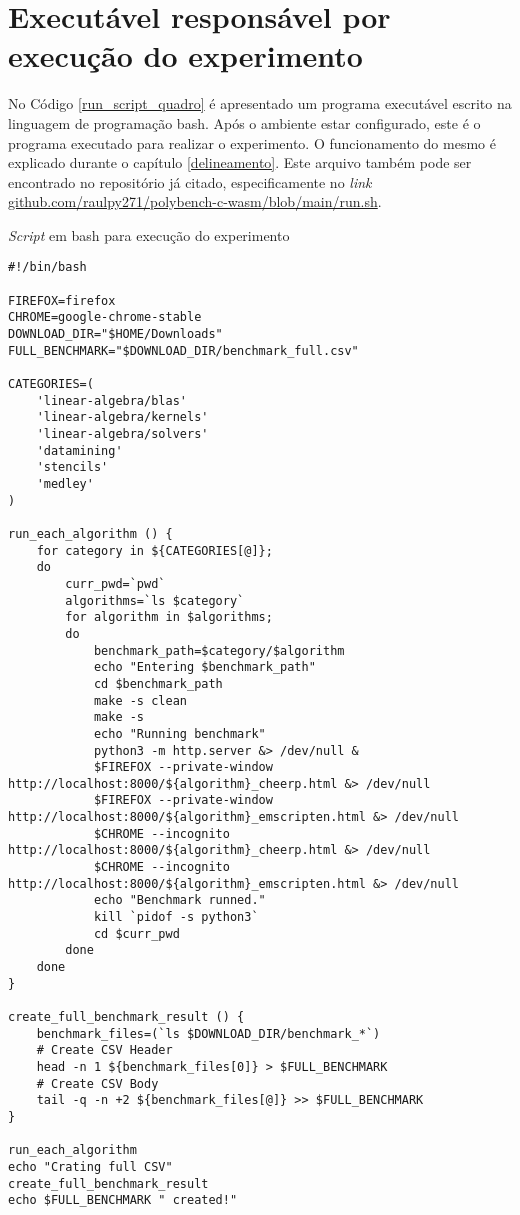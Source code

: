 
\chapter{Executável responsável por execução do experimento}\label{run_script}

No Código \ref{run_script_quadro} é apresentado um programa executável escrito na linguagem de programação bash. Após o ambiente estar configurado, este é o programa executado para realizar o experimento. O funcionamento do mesmo é explicado durante o capítulo \ref{delineamento}. Este arquivo também pode ser encontrado no repositório já citado, especificamente no \textit{link} \href{https://github.com/raulpy271/polybench-c-wasm/blob/main/run.sh}{github.com/raulpy271/polybench-c-wasm/blob/main/run.sh}.

\begin{quadro}
\caption{\textit{Script} em bash para execução do experimento\label{run_script_quadro}}
\begin{lstlisting}[tabsize=2, basicstyle=\ttfamily\tiny]
#!/bin/bash

FIREFOX=firefox
CHROME=google-chrome-stable
DOWNLOAD_DIR="$HOME/Downloads"
FULL_BENCHMARK="$DOWNLOAD_DIR/benchmark_full.csv"

CATEGORIES=(
    'linear-algebra/blas'
    'linear-algebra/kernels'
    'linear-algebra/solvers'
    'datamining'
    'stencils'
    'medley'
)

run_each_algorithm () {
    for category in ${CATEGORIES[@]};
    do
        curr_pwd=`pwd`
        algorithms=`ls $category`
        for algorithm in $algorithms;
        do
            benchmark_path=$category/$algorithm
            echo "Entering $benchmark_path"
            cd $benchmark_path
            make -s clean
            make -s
            echo "Running benchmark"
            python3 -m http.server &> /dev/null &
            $FIREFOX --private-window http://localhost:8000/${algorithm}_cheerp.html &> /dev/null
            $FIREFOX --private-window http://localhost:8000/${algorithm}_emscripten.html &> /dev/null
            $CHROME --incognito http://localhost:8000/${algorithm}_cheerp.html &> /dev/null
            $CHROME --incognito http://localhost:8000/${algorithm}_emscripten.html &> /dev/null
            echo "Benchmark runned."
            kill `pidof -s python3`
            cd $curr_pwd
        done
    done
}

create_full_benchmark_result () {
    benchmark_files=(`ls $DOWNLOAD_DIR/benchmark_*`)
    # Create CSV Header
    head -n 1 ${benchmark_files[0]} > $FULL_BENCHMARK
    # Create CSV Body
    tail -q -n +2 ${benchmark_files[@]} >> $FULL_BENCHMARK
}

run_each_algorithm
echo "Crating full CSV"
create_full_benchmark_result
echo $FULL_BENCHMARK " created!"
\end{lstlisting}
\end{quadro}

